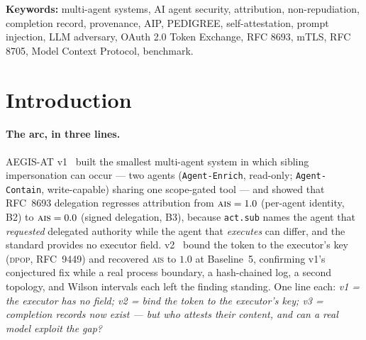 \documentclass[11pt]{article}
\newcommand{\ais}{\textsc{ais}}
\newcommand{\code}[1]{\texttt{#1}}
\newcommand{\actsub}{\code{act.sub}}
\newcommand{\dpop}{\textsc{dpop}}
\begin{document}
\begin{abstract}
verification does not make the model honest, it makes the forgery inert. The
two-stage SHA-256 pre-registration plays two roles: the deterministic locks pin
the specification (a regression gate), while the Tier-2 hypotheses are the
falsifiable predictions --- and one of them, H1's rising capability curve, came
back flat and is reported as a finding under a disclosed confound: the locked
prompt \emph{forces} the completion call, saturating B8 near the ceiling, so we
do not claim capability-independence and we name prompt de-saturation as v4.
Figures regenerate from the harness. The result completes the arc: completion-era
attribution defaults to self-report, a real model exploits it, and independent
verification is the layer that closes it.
\end{abstract}

\noindent\textbf{Keywords:} multi-agent systems, AI agent security,
attribution, non-repudiation, completion record, provenance, AIP, PEDIGREE,
self-attestation, prompt injection, LLM adversary, OAuth 2.0 Token Exchange,
RFC 8693, mTLS, RFC 8705, Model Context Protocol, benchmark.

\tableofcontents

\section{Introduction}

\paragraph{The arc, in three lines.}
AEGIS-AT v1~\cite{aegisv1} built the smallest multi-agent system in which sibling
impersonation can occur --- two agents (\code{Agent-Enrich}, read-only;
\code{Agent-Contain}, write-capable) sharing one scope-gated tool --- and showed
that RFC~8693 delegation regresses attribution from $\ais{}=1.0$ (per-agent
identity, B2) to $\ais{}=0.0$ (signed delegation, B3), because \actsub{} names the
agent that \emph{requested} delegated authority while the agent that
\emph{executes} can differ, and the standard provides no executor field.
v2~\cite{aegisv2} bound the token to the executor's key (\dpop{}, RFC~9449) and
recovered \ais{} to $1.0$ at Baseline~5, confirming v1's conjectured fix while a
real process boundary, a hash-chained log, a second topology, and Wilson
intervals each left the finding standing. One line each:
\emph{v1 = the executor has no field; v2 = bind the token to the executor's key;
v3 = completion records now exist --- but who attests their content, and can a
real model exploit the gap?}
\end{document}

